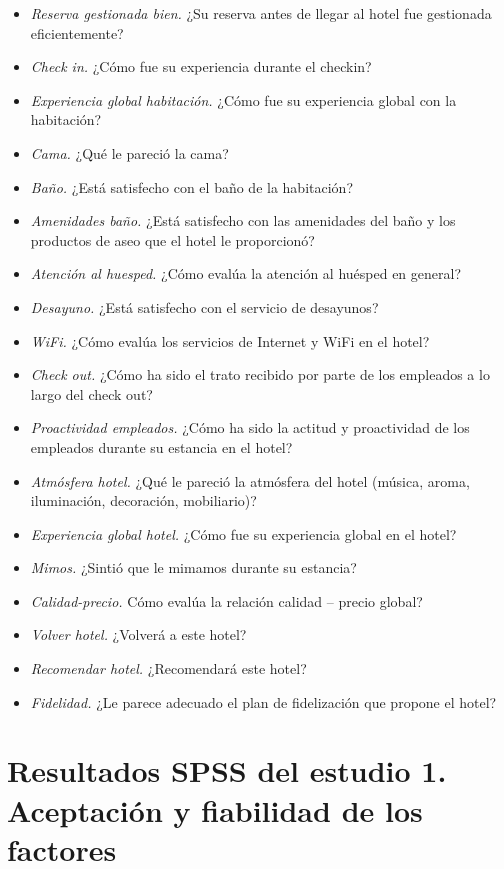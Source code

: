 \begin{itemize}
	\item \emph{Reserva gestionada bien.} ¿Su reserva antes de llegar al hotel fue gestionada eficientemente?
	\item \emph{Check in.} ¿Cómo fue su experiencia durante el checkin?
	\item \emph{Experiencia global habitación.} ¿Cómo fue su experiencia global con la habitación?
	\item \emph{Cama.} ¿Qué le pareció la cama?
	\item \emph{Baño.} ¿Está satisfecho con el baño de la habitación?
	\item \emph{Amenidades baño.} ¿Está satisfecho con las amenidades del baño y los productos de aseo que el hotel le proporcionó?
	\item \emph{Atención al huesped.} ¿Cómo evalúa la atención al huésped en general?
	\item \emph{Desayuno.} ¿Está satisfecho con el servicio de desayunos?
	\item \emph{WiFi.} ¿Cómo evalúa los servicios de Internet y WiFi en el hotel?
	\item \emph{Check out.} ¿Cómo ha sido el trato recibido por parte de los empleados a lo largo del check out?
	\item \emph{Proactividad empleados.} ¿Cómo ha sido la actitud y proactividad de los empleados durante su estancia en el hotel?
	\item \emph{Atmósfera hotel.} ¿Qué le pareció la atmósfera del hotel (música, aroma, iluminación, decoración, mobiliario)?
	\item \emph{Experiencia global hotel.} ¿Cómo fue su experiencia global en el hotel?
	\item \emph{Mimos.} ¿Sintió que le mimamos durante su estancia?
	\item \emph{Calidad-precio.} Cómo evalúa la relación calidad – precio global?
	\item \emph{Volver hotel.} ¿Volverá a este hotel?
	\item \emph{Recomendar hotel.} ¿Recomendará este hotel?
	\item \emph{Fidelidad.} ¿Le parece adecuado el plan de fidelización que propone el hotel?
\end{itemize}

\chapter{Resultados SPSS del estudio 1. Aceptación y fiabilidad de los factores}
\label{anexo:9}

